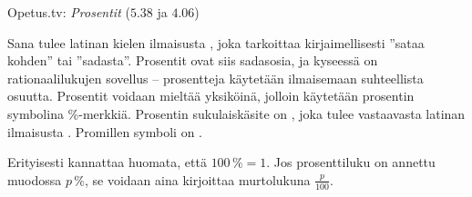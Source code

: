 {Opetus.tv: \emph{Prosentit} ($5.38$ ja $4.06$)}

Sana  tulee latinan kielen ilmaisusta , joka tarkoittaa kirjaimellisesti ''sataa kohden'' tai ''sadasta''. Prosentit ovat siis sadasosia, ja kyseessä on rationaalilukujen sovellus -- prosentteja käytetään ilmaisemaan suhteellista osuutta. Prosentit voidaan mieltää yksiköinä, jolloin käytetään prosentin symbolina \%-merkkiä. Prosentin sukulaiskäsite on , joka tulee vastaavasta latinan ilmaisusta . Promillen symboli on \permil.


Erityisesti kannattaa huomata, että $100\,\%=1$. Jos prosenttiluku on annettu muodossa $p$\,\%, se voidaan aina kirjoittaa murtolukuna $\frac{p}{100}$.

\begin{esimerkki}
\end{esimerkki}

%
%

